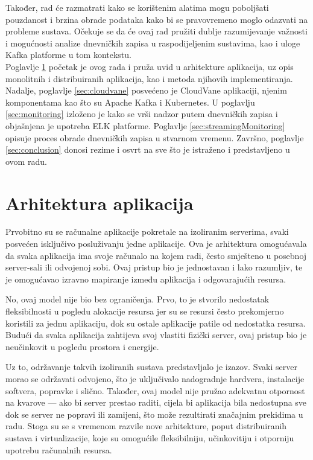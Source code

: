 \documentclass[times, utf8, diplomski]{fer}
\begin{document}
Također, rad će razmatrati kako se korištenim alatima mogu poboljšati pouzdanost i brzina obrade podataka kako bi se pravovremeno moglo odazvati na probleme sustava. Očekuje se da će ovaj rad pružiti dublje razumijevanje važnosti i mogućnosti analize dnevničkih zapisa u raspodijeljenim sustavima, kao i uloge Kafka platforme u tom kontekstu.\\

Poglavlje \ref{sec:app_arch} početak je ovog rada i pruža uvid u arhitekture aplikacija, uz opis monolitnih i distribuiranih aplikacija, kao i metoda njihovih implementiranja. Nadalje, poglavlje \ref{sec:cloudvane} posvećeno je CloudVane aplikaciji, njenim komponentama kao što su Apache Kafka i Kubernetes. U poglavlju \ref{sec:monitoring} izloženo je kako se vrši nadzor putem dnevničkih zapisa i objašnjena je upotreba ELK platforme. Poglavlje \ref{sec:streamingMonitoring} opisuje proces obrade dnevničkih zapisa u stvarnom vremenu. Završno, poglavlje \ref{sec:conclusion} donosi rezime i osvrt na sve što je istraženo i predstavljeno u ovom radu.

\chapter{Arhitektura aplikacija}
\label{sec:app_arch}

Prvobitno su se računalne aplikacije pokretale na izoliranim serverima, svaki posvećen isključivo posluživanju jedne aplikacije. Ova je arhitektura omogućavala da svaka aplikacija ima svoje računalo na kojem radi, često smješteno u posebnoj server-sali ili odvojenoj sobi. Ovaj pristup bio je jednostavan i lako razumljiv, te je omogućavao izravno mapiranje između aplikacija i odgovarajućih resursa. 

No, ovaj model nije bio bez ograničenja. Prvo, to je stvorilo nedostatak fleksibilnosti u pogledu alokacije resursa jer su se resursi često prekomjerno koristili za jednu aplikaciju, dok su ostale aplikacije patile od nedostatka resursa. Budući da svaka aplikacija zahtijeva svoj vlastiti fizički server, ovaj pristup bio je neučinkovit u pogledu prostora i energije.

Uz to, održavanje takvih izoliranih sustava predstavljalo je izazov. Svaki server morao se održavati odvojeno, što je uključivalo nadogradnje hardvera, instalacije softvera, popravke i slično. Također, ovaj model nije pružao adekvatnu otpornost na kvarove --- ako bi server prestao raditi, cijela bi aplikacija bila nedostupna sve dok se server ne popravi ili zamijeni, što može rezultirati značajnim prekidima u radu.
Stoga su se s vremenom razvile nove arhitekture, poput distribuiranih sustava i virtualizacije, koje su omogućile fleksibilniju, učinkovitiju i otporniju upotrebu računalnih resursa.\\
\end{document}
